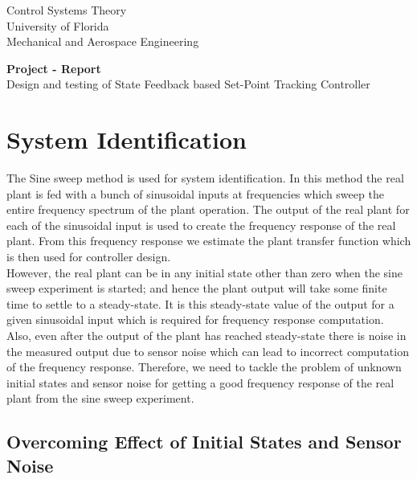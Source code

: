 \documentclass[11pt,usenames]{article}
\title{}
\date{}
\begin{document}
\begin{center}
{\sc Control Systems Theory}\\
University of Florida \\
 Mechanical and Aerospace Engineering
\vspace{0.5 cm}
\end{center}

{\large \begin{center}
	\textbf{Project - Report}\\
	Design and testing of State Feedback based Set-Point Tracking Controller
\end{center}}


\section{System Identification}
The Sine sweep method is used for system identification. In this method the real plant is fed with a bunch of sinusoidal inputs at frequencies which sweep the entire frequency spectrum of the plant operation. The output of the real plant for each of the sinusoidal input is used to create the frequency response of the real plant. From this frequency response we estimate the plant transfer function which is then used for controller design.\\
However, the real plant can be in any initial state other than zero when the sine sweep experiment is started; and hence the plant output will take some finite time to settle to a steady-state. It is this steady-state value of the output for a given sinusoidal input which is required for frequency response computation. Also, even after the output of the plant has reached steady-state there is noise in the measured output due to sensor noise which can lead to incorrect computation of the frequency response.
Therefore, we need to tackle the problem of unknown initial states and sensor noise for getting a good frequency response of the real plant from the sine sweep experiment.

\subsection{ Overcoming Effect of Initial States and Sensor Noise}
\end{document}
